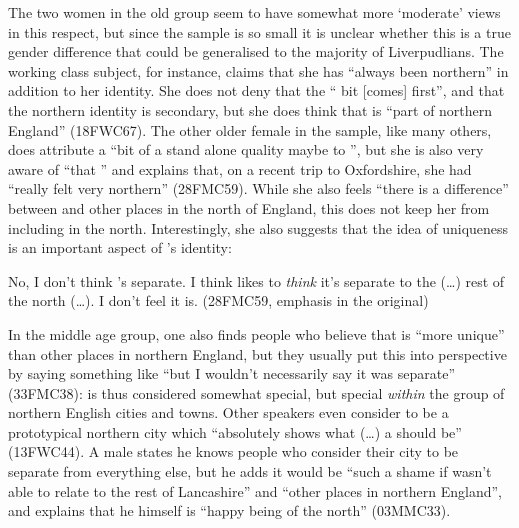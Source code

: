 The two women in the old group seem to have somewhat more `moderate' views in this respect, but since the sample is so small it is unclear whether this is a true gender difference that could be generalised to the majority of Liverpudlians.
The working class subject, for instance, claims that she has ``always been northern'' in addition to her  identity.
She does not deny that the `` bit [comes] first'', and that the northern identity is secondary, but she does think that  is ``part of northern England'' (18FWC67).
The other older female in the sample, like many others, does attribute a ``bit of a stand alone quality maybe to '', but she is also very aware of ``that '' and explains that, on a recent trip to Oxfordshire, she had ``really felt very northern'' (28FMC59).
While she also feels ``there is a difference'' between  and other places in the north of England, this does not keep her from including  in the north.
Interestingly, she also suggests that the idea of uniqueness is an important aspect of 's identity:
\begin{example}
	No, I don't think 's separate. I think  likes to \emph{think} it's separate to the (\ldots) rest of the north (\ldots). I don't feel it is. (28FMC59, emphasis in the original)
\end{example}

In the middle age group, one also finds people who believe that  is ``more unique'' than other places in northern England, but they usually put this into perspective by saying something like ``but I wouldn't necessarily say it was separate'' (33FMC38):  is thus considered somewhat special, but special \emph{within} the group of northern English cities and towns.
Other speakers even consider  to be a prototypical northern city which ``absolutely shows what (\ldots) a  should be'' (13FWC44).
A male  states he knows people who consider their city to be separate from everything else, but he adds it would be ``such a shame if  wasn't able to relate to the rest of Lancashire'' and ``other places in northern England'', and explains that he himself is ``happy being of the north'' (03MMC33).

